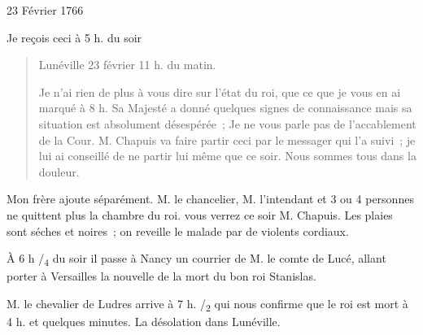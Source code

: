 \begin{diary}{23 Février 1766}{}
        
                         Je reçois ceci à 5 h. du soir \bigskip
        
        
                        \begin{quote}\begin{flushright}
                              Lunéville
                              23 février 11 h. du matin.\end{flushright}
                              Je n'ai rien de plus à vous dire sur l'état du roi,
                              que ce que je vous en ai marqué à 8 h. Sa Majesté
                              a donné quelques signes de connaissance
                              mais sa situation est absolument désespérée ;
                              Je ne vous parle pas de l'accablement de la
                              Cour. M. Chapuis va faire partir ceci
                              par le messager qui l'a suivi ; je lui ai conseillé de ne partir lui même
                              que ce soir.
                              Nous sommes tous dans la douleur. \bigskip
        
        \end{quote}
                        
                           Mon frère ajoute séparément. \og 
                              M. le chancelier, M. l'intendant et 3 ou 4
                              personnes ne quittent plus la chambre du roi.
                              vous verrez ce soir M. Chapuis.
                              Les plaies
                              sont séches et noires ; on reveille le
                              malade par de violents cordiaux.  \fg{}
                        \bigskip
        
        
                         À 6
                              h /\textsubscript{4} du soir il
                           passe à Nancy un courrier
                           de M. le comte de Lucé, allant
                           porter à Versailles
                           la nouvelle de la mort du bon roi
                              Stanislas. \bigskip
        
        
                        
                           M. le chevalier de Ludres arrive à 7 h. /\textsubscript{2} qui
                           nous confirme que le roi
                           est mort à 4 h. et
                              quelques minutes. La désolation dans Lunéville. \bigskip
        

\end{diary}
